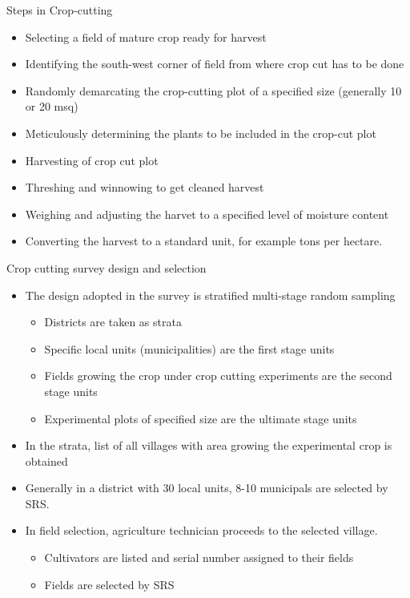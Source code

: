 \documentclass[11pt,dvipsnames,ignorenonframetext,aspectratio=169]{beamer}
\providecommand{\tightlist}{%
  \setlength{\itemsep}{0pt}\setlength{\parskip}{0pt}}
\begin{document}
\begin{frame}{Steps in Crop-cutting}
\protect\hypertarget{steps-in-crop-cutting}{}
\begin{itemize}
\tightlist
\item
  Selecting a field of mature crop ready for harvest
\item
  Identifying the south-west corner of field from where crop cut has to
  be done
\item
  Randomly demarcating the crop-cutting plot of a specified size
  (generally 10 or 20 msq)
\item
  Meticulously determining the plants to be included in the crop-cut
  plot
\item
  Harvesting of crop cut plot
\item
  Threshing and winnowing to get cleaned harvest
\item
  Weighing and adjusting the harvet to a specified level of moisture
  content
\item
  Converting the harvest to a standard unit, for example tons per
  hectare.
\end{itemize}
\end{frame}

\begin{frame}{Crop cutting survey design and selection}
\protect\hypertarget{crop-cutting-survey-design-and-selection}{}
\begin{itemize}
\tightlist
\item
  The design adopted in the survey is stratified multi-stage random
  sampling

  \begin{itemize}
  \tightlist
  \item
    Districts are taken as strata
  \item
    Specific local units (municipalities) are the first stage units
  \item
    Fields growing the crop under crop cutting experiments are the
    second stage units
  \item
    Experimental plots of specified size are the ultimate stage units
  \end{itemize}
\item
  In the strata, list of all villages with area growing the experimental
  crop is obtained
\item
  Generally in a district with 30 local units, 8-10 municipals are
  selected by SRS.
\item
  In field selection, agriculture technician proceeds to the selected
  village.

  \begin{itemize}
  \tightlist
  \item
    Cultivators are listed and serial number assigned to their fields
  \item
    Fields are selected by SRS
  \end{itemize}
\end{itemize}
\end{frame}
\end{document}
